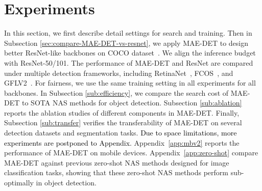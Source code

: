 \documentclass[nohyperref]{article}
\theoremstyle{plain}
\theoremstyle{definition}
\theoremstyle{remark}
\begin{document}
\section{Experiments}

In this section, we first describe detail settings for search and training. Then in Subsection \ref{sec:compare-MAE-DET-vs-resnet}, we apply MAE-DET to design better ResNet-like backbones on COCO dataset~\citep{coco}. We align the inference budget with ResNet-50/101. The performance of MAE-DET and ResNet are compared under multiple detection frameworks, including RetinaNet~\citep{retinanet}, FCOS~\citep{fcos}, and GFLV2~\citep{gfv2}. For fairness, we use the same training setting in all experiments for all backbones. In Subsection \ref{sub:efficiency}, we compare the search cost of MAE-DET to SOTA NAS methods for object detection. 
Subsection \ref{sub:ablation} reports the ablation studies of different components in MAE-DET. Finally, Subsection \ref{sub:transfer} verifies the transferability of MAE-DET on several detection datasets and segmentation tasks.
\textcolor{black}{Due to space limitations, more experiments are postponed to Appendix.} Appendix~\ref{app:mbv2} reports the performance of MAE-DET on mobile devices. Appendix~\ref{app:zero-shot} compare MAE-DET against previous zero-shot NAS methods designed for image classification tasks, showing that these zero-shot NAS methods perform sub-optimally in object detection.
\end{document}

